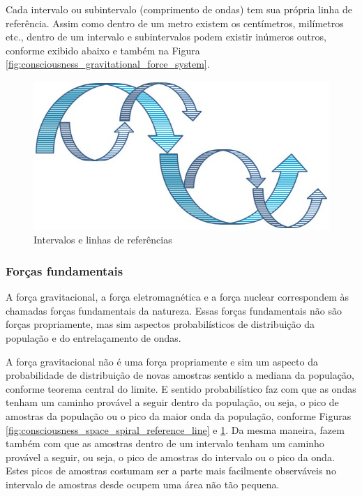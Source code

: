 Cada intervalo ou subintervalo (comprimento de ondas) tem sua própria linha de referência. Assim como dentro de um metro existem os centímetros, milímetros etc., dentro de um intervalo e subintervalos podem existir inúmeros outros, conforme exibido abaixo e também na Figura \ref{fig:consciousness_gravitational_force_system}.
	\begin{figure}[H]
	\caption{Intervalos e linhas de referências}
	\label{fig:consciousness_space_spiral_underlines}
	\centering
	\includegraphics[scale=.5]{sections/images/consciousness_space_spiral_underlines.jpg}
	\end{figure}

\subsubsection{Forças fundamentais}
A força gravitacional, a força eletromagnética e a força nuclear correspondem às chamadas forças fundamentais da natureza. Essas forças fundamentais não são forças propriamente, mas sim aspectos probabilísticos de distribuição da população e do entrelaçamento de ondas.

A força gravitacional não é uma força propriamente e sim um aspecto da probabilidade de distribuição de novas amostras sentido a mediana da população, conforme teorema central do limite. E sentido probabilístico faz com que as ondas tenham um caminho provável a seguir dentro da população, ou seja, o pico de amostras da população ou o pico da maior onda da população, conforme Figuras \ref{fig:consciousness_space_spiral_reference_line} e \ref{fig:consciousness_space_spiral_underlines}. Da mesma maneira, fazem também com que as amostras dentro de um intervalo tenham um caminho provável a seguir, ou seja, o pico de amostras do intervalo ou o pico da onda. Estes picos de amostras costumam ser a parte mais facilmente observáveis no intervalo de amostras desde ocupem uma área não tão pequena.

